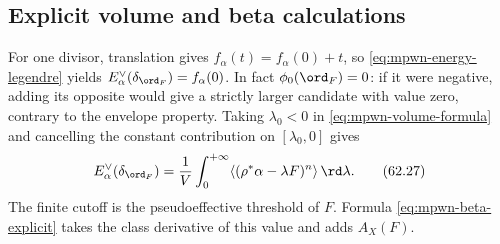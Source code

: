\subsection{Explicit volume and beta calculations}
\label{subsec:mpwn-k-volume-examples}

\begin{example}\label{ex:mpwn-one-divisor-beta}
For one divisor, translation gives
$f_\alpha(t)=f_\alpha(0)+t$, so
\eqref{eq:mpwn-energy-legendre} yields
$E_\alpha^\vee(\delta_{\ord_F})=f_\alpha(0)$.
In fact $\phi_0(\ord_F)=0$: if it were negative, adding its
opposite would give a strictly larger candidate with value zero,
contrary to the envelope property.
Taking $\lambda_0<0$ in \eqref{eq:mpwn-volume-formula} and cancelling
the constant contribution on $[\lambda_0,0]$ gives
\[
 E_\alpha^\vee(\delta_{\ord_F})
   =\frac1V\int_0^{+\infty}
          \langle(\rho^*\alpha-\lambda F)^n\rangle\,\rd\lambda.
\tag{62.27}\label{eq:mpwn-one-divisor-energy}
\]
The finite cutoff is the pseudoeffective threshold of $F$.
Formula \eqref{eq:mpwn-beta-explicit} takes the class derivative
of this value and adds $A_X(F)$.
\end{example}

